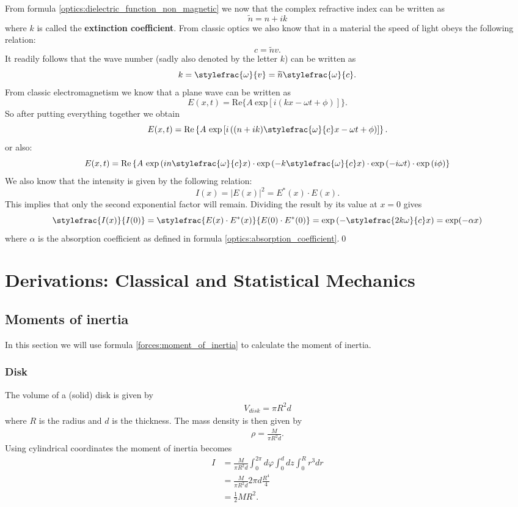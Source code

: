     From formula \ref{optics:dielectric_function_non_magnetic} we now that the complex refractive index can be written as \[\widetilde{n} = n+ik\] where $k$ is called the \textbf{extinction coefficient}. From classic optics we also know that in a material the speed of light obeys the following relation: \[c = \widetilde{n}v.\] It readily follows that the wave number (sadly also denoted by the letter $k$) can be written as \[k = \stylefrac{\omega}{v} = \widetilde{n}\stylefrac{\omega}{c}.\]
    From classic electromagnetism we know that a plane wave can be written as \[E(x, t) = \text{Re}\big\{A\ \text{exp}\left[i(kx - \omega t + \phi)\right]\big\}.\]
    So after putting everything together we obtain \[E(x, t) = \text{Re}\left\{A\ \text{exp}\left[i\left((n+ik)\stylefrac{\omega}{c}x - \omega t + \phi\right)\right]\right\}.\]
    or also:\[E(x, t) = \text{Re}\left\{A\ \text{exp}\left(in\stylefrac{\omega}{c}x\right)\cdot\text{exp}\left(-k\stylefrac{\omega}{c}x\right)\cdot\text{exp}\left(-i\omega t\right)\cdot\text{exp}\left(i\phi\right)\right\}\]
    We also know that the intensity is given by the following relation:\[I(x) = |E(x)|^2 = E^*(x)\cdot E(x).\]
    This implies that only the second exponential factor will remain. Dividing the result by its value at $x=0$ gives \[\stylefrac{I(x)}{I(0)} = \stylefrac{E(x)\cdot E^*(x)}{E(0)\cdot E^*(0)} = \text{exp}\left(-\stylefrac{2k\omega}{c}x\right) = \text{exp}(-\alpha x)\]
    where $\alpha$ is the absorption coefficient as defined in formula \ref{optics:absorption_coefficient}.\qed

\chapter{Derivations: Classical and Statistical Mechanics}
\section{Moments of inertia}\label{deriv:inertia}

In this section we will use formula \ref{forces:moment_of_inertia} to calculate the moment of inertia.
\subsection{Disk}

    The volume of a (solid) disk is given by
    \begin{gather}
        V_{disk} = \pi R^2d
    \end{gather}
    where $R$ is the radius and $d$ is the thickness. The mass density is then given by
    \begin{gather}
        \rho = \frac{M}{\pi R^2d}.
    \end{gather}
    Using cylindrical coordinates the moment of inertia becomes
    \begin{align}
        I &= \frac{M}{\pi R^2d}\int_0^{2\pi}d\varphi\int_0^ddz\int_0^Rr^3dr\\
        &= \frac{M}{\pi R^2d}2\pi d\frac{R^4}{4}\\
        &= \frac{1}{2}MR^2.
    \end{align}

